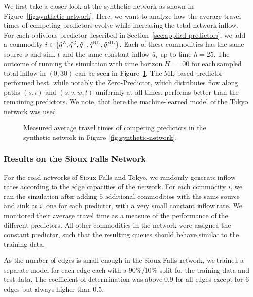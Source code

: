 We first take a closer look at the synthetic network as shown in Figure~\ref{fig:synthetic-network}.
Here, we want to analyze how the average travel times of competing predictors evolve while increasing the total network inflow. 
For each oblivious predictor described in Section~\ref{sec:applied-predictors}, we add a commodity $i\in\{\hat q^{\text{Z}}, \hat q^{\text{C}}, \hat q^{\text{L}}, \hat q^{\text{RL}}, \hat q^{\text{ML}} \}$.
Each of these commodities has the same source $s$ and sink $t$ and the same constant inflow $\bar u_i$ up to time $h=25$.
The outcome of running the simulation with time horizon $H=100$ for each sampled total inflow in $(0, 30)$ can be seen in Figure~\ref{fig:synthetic-travel-times}.
The ML based predictor performed best, while notably the Zero-Predictor, which distributes flow along paths $(s,t)$ and $(s,v,w,t)$ uniformly at all times, performs better than the remaining predictors.
We note, that here the machine-learned model of the Tokyo network was used.

\begin{figure}[hb]
    \centering
    
    \caption{Measured average travel times of competing predictors in the synthetic network in Figure~\ref{fig:synthetic-network}.}\label{fig:synthetic-travel-times}
\end{figure}



\subsubsection*{Results on the Sioux Falls Network}

For the road-networks of Sioux Falls and Tokyo, we randomly generate inflow rates according to the edge capacities of the network.
For each commodity $i$, we ran the simulation after adding $5$ additional commodities with the same source and sink as $i$, one for each predictor, with a very small constant inflow rate.
We monitored their average travel time as a measure of the performance of the different predictors.
All other commodities in the network were assigned the constant predictor, such that the resulting queues should behave similar to the training data.

As the number of edges is small enough in the Sioux Falls network, we trained a separate model for each edge each with a $90\% / 10\%$ split for the training data and test data.
The coefficient of determination was above $0{.}9$ for all edges except for $6$ edges but always higher than $0{.}5$.

